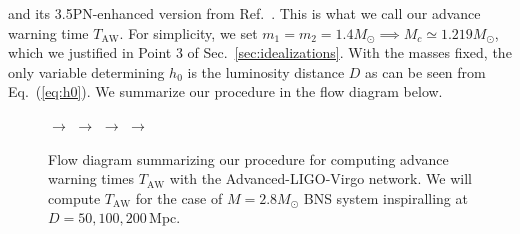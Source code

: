 \documentclass[11pt,a4paper]{article}
\begin{document}
 and its 3.5PN-enhanced version from Ref.~\cite{Blanchet_LRR}. This is what we call our advance warning time $T_\text{AW}$.
 For simplicity, we set $m_1=m_2=1.4 M_\odot \implies M_c\simeq 1.219 M_\odot$, which we justified in
 Point 3 of Sec.~\ref{sec:idealizations}. 
 With the masses fixed, the only variable determining $h_0$ is the luminosity distance $D$ as can be seen from Eq.~(\ref{eq:h0}).
 We summarize our procedure in the flow diagram below.
  \begin{figure}[h!]
 $\longrightarrow$ 
 $\longrightarrow$   $\longrightarrow$  
 $\longrightarrow$  
  \caption{Flow diagram summarizing our procedure for computing advance warning times $T_\text{AW}$ with the Advanced-LIGO-Virgo network. 
  We will compute $T_\text{AW}$ for the case of $M=2.8M_\odot$ BNS system inspiralling at $D=50,100,200\,$Mpc. 
  }\label{fig:flow}
\end{figure}
\end{document}
